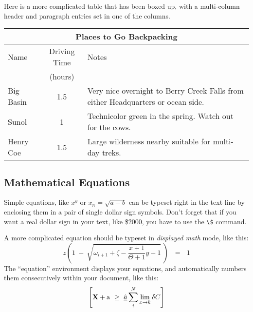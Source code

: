 Here is a more complicated table that has been boxed up, with a multi-column
header and paragraph entries set in one of the columns.
\begin{table}[H]
\centering
\begin{tabular}{lcp{3.5in}}
\toprule
\multicolumn{3}{c}{Places to Go Backpacking}\\ 
\hline
%
Name & Driving Time & Notes\\
     & (hours)      &\\ 
\midrule
Big Basin & 1.5 & 
Very nice overnight to Berry Creek Falls from
either Headquarters or ocean side.\\ 
%
Sunol & 1 & 
Technicolor green in the spring.  Watch out for the cows.\\ 
%
Henry Coe & 1.5 & 
Large wilderness nearby suitable for multi-day treks.\\ 
%
\bottomrule
\end{tabular}
\end{table}

\subsection{Mathematical Equations}
Simple equations, like $x^y$ or $x_n = \sqrt{a + b}$ can be typeset right
in the text line by enclosing them in a pair of single dollar sign symbols.
Don't forget that if you want a real dollar sign in your text, like \$2000,
you have to use the \verb+\$+ command.

A more complicated equation should be typeset in {\em displayed math\/} mode,
like this:
\[
z \left( 1 \ +\  \sqrt{\omega_{i+1} + \zeta -\frac{x+1}{\Theta +1} y + 1} 
\ \right)
\ \ \ =\ \ \  1
\]
The ``equation'' environment displays your equations, and automatically
numbers them consecutively within your document, like this:
\begin{equation}
\left[
{\bf X} + {\rm a} \ \geq\ 
\underline{\hat a} \sum_i^N \lim_{x \rightarrow k} \delta C
\right]
\end{equation}